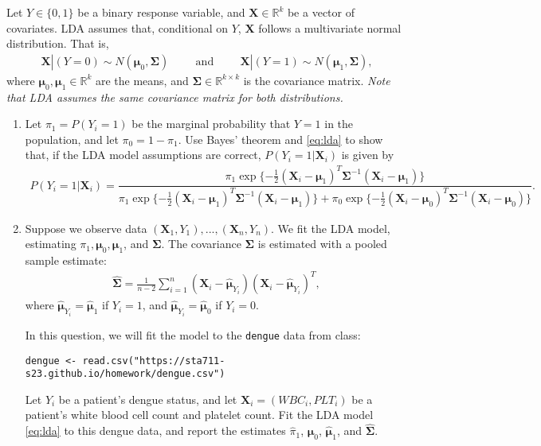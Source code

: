 \documentclass[11pt]{article}
\begin{document}
Let $Y \in \{0,1\}$ be a binary response variable, and $\bm{X} \in \mathbb{R}^{k}$ be a vector of covariates. LDA assumes that, conditional on $Y$, $\bm{X}$ follows a multivariate normal distribution. That is,
\begin{align}
\label{eq:lda}
\bm{X}|(Y = 0) \sim N(\bm{\mu}_0, \bm{\Sigma}) \hspace{1cm} \text{and} \hspace{1cm} \bm{X}|(Y = 1) \sim N(\bm{\mu}_1, \bm{\Sigma}),
\end{align}
where $\bm{\mu}_0, \bm{\mu}_1 \in \mathbb{R}^k$ are the means, and $\bm{\Sigma} \in \mathbb{R}^{k \times k}$ is the covariance matrix. \textit{Note that LDA assumes the same covariance matrix for both distributions.}

\begin{enumerate}
\item Let $\pi_1 = P(Y_i = 1)$ be the marginal probability that $Y = 1$ in the population, and let $\pi_0 = 1 - \pi_1$. Use Bayes' theorem and \eqref{eq:lda} to show that, if the LDA model assumptions are correct, $P(Y_i = 1 | \bm{X}_i)$ is given by
\begin{align*}
P(Y_i = 1 | \bm{X}_i) = \dfrac{\pi_1 \exp \{-\frac{1}{2} (\bm{X}_i - \bm{\mu}_1)^T \bm{\Sigma}^{-1} (\bm{X}_i - \bm{\mu}_1) \}}{\pi_1 \exp \{-\frac{1}{2} (\bm{X}_i - \bm{\mu}_1)^T \bm{\Sigma}^{-1} (\bm{X}_i - \bm{\mu}_1) \} + \pi_0 \exp \{-\frac{1}{2} (\bm{X}_i - \bm{\mu}_0)^T \bm{\Sigma}^{-1} (\bm{X}_i - \bm{\mu}_0) \}}.
\end{align*}

\item Suppose we observe data $(\bm{X}_1, Y_1), ..., (\bm{X}_n, Y_n)$. We fit the LDA model, estimating $\pi_1, \bm{\mu}_0, \bm{\mu}_1$, and $\bm{\Sigma}$. The covariance $\bm{\Sigma}$ is estimated with a pooled sample estimate:
\begin{align*}
\widehat{\bm{\Sigma}} = \frac{1}{n-2} \sum \limits_{i=1}^n (\bm{X}_i - \widehat{\bm{\mu}}_{Y_i}) (\bm{X}_i - \widehat{\bm{\mu}}_{Y_i})^T ,
\end{align*}
where $\widehat{\bm{\mu}}_{Y_i} = \widehat{\bm{\mu}}_1$ if $Y_i = 1$, and $\widehat{\bm{\mu}}_{Y_i} = \widehat{\bm{\mu}}_0$ if $Y_i = 0$.

In this question, we will fit the model to the \texttt{dengue} data from class: 
\begin{verbatim}
dengue <- read.csv("https://sta711-s23.github.io/homework/dengue.csv")
\end{verbatim}
Let $Y_i$ be a patient's dengue status, and let $\bm{X}_i = (WBC_i, PLT_i)$ be a patient's white blood cell count and platelet count. Fit the LDA model \eqref{eq:lda} to this dengue data, and report the estimates $\widehat{\pi}_1$, $\widehat{\bm{\mu}}_0$, $\widehat{\bm{\mu}}_1$, and $\widehat{\bm{\Sigma}}$.


\end{enumerate}
\end{document}
